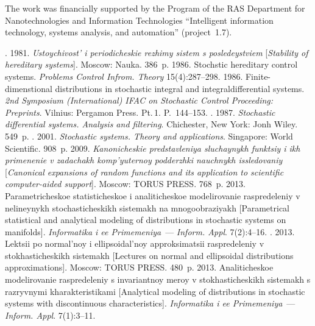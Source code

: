 \Ack
\noindent
The work was financially supported by the Program of the RAS
Department for Nanotechnologies and Information Technologies
``Intelligent information technology, systems analysis, and automation''
(project~1.7).



  \begin{multicols}{2}

\renewcommand{\bibname}{\protect\rmfamily References}

{\small\frenchspacing
{%
\begin{thebibliography}{9}

. 
1981. \textit{Ustoychivost' i periodicheskie rezhimy sistem s posledeystviem} 
[\textit{Stability of hereditary systems}]. Moscow: Nauka. 386~p.
1986. Stochstic hereditary control systems. \textit{Problems Control Infrom. Theory} 
15(4):287--298.
 1986. Finite-dimenstional distributions in stochastic 
integral and integraldifferential systems. 
\textit{2nd  Symposium (International) IFAC on Stochastic Control Proceeding: Preprints}.
 Vilnius: Pergamon Press. Pt.\,1. P.~144--153.
. 
1987. \textit{Stochastic differential systems. Analysis and filtering}. 
Chichester, New York: Jonh Wiley. 549~p.
. 
2001. \textit{Stochastic systems. Theory and applications}. Singapore: World Scientific. 908~p.
2009. \textit{Kanonicheskie predstavleniya slu\-chay\-nykh funktsiy i ikh primenenie v zadachakh 
komp'yuternoy podderzhki nauchnykh issledovaniy} 
[\textit{Canonical expansions of random functions and its application to scientific 
computer-aided support}].  Moscow: TORUS PRESS. 768~p.
 2013.
Parametricheskoe statisticheskoe i analiticheskoe modelirovanie 
raspredeleniy v nelineynykh stochasticheskikh sistemakh na mnogoobraziyakh 
[Parametrical statistical and analytical modeling of distributions in 
stochastic systems on manifolds]. \textit{Informatika i ee Primemeniya}~---
\textit{Inform. Appl}. 7(2):4--16.
.  2013. 
Lektsii po nor\-mal'\-noy i ellipsoidal'noy approksimatsii raspredeleniy 
v stokhasticheskikh sistemakh 
[Lectures on normal and ellipsoidal distributions approximations]. Moscow: TORUS PRESS. 480~p.
 2013. 
Analiticheskoe modelirovanie raspredeleniy s invariantnoy meroy v 
stokhasticheskikh sistemakh s razryvnymi kharakteristikami 
[Analytical modeling of distributions in stochastic systems with 
discontinuous characteristics]. \textit{Informatika i ee Primemeniya}~---
\textit{Inform. Appl}. 7(1):3--11.

\end{thebibliography}
} }


\end{multicols}

